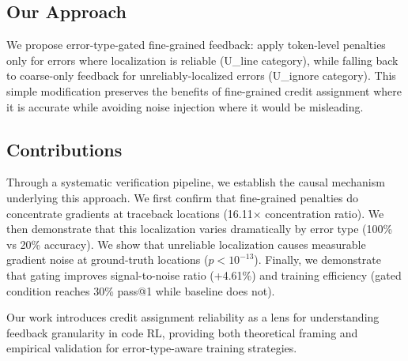 \subsection{Our Approach}

We propose error-type-gated fine-grained feedback: apply token-level penalties only for errors where localization is reliable (U\_line category), while falling back to coarse-only feedback for unreliably-localized errors (U\_ignore category). This simple modification preserves the benefits of fine-grained credit assignment where it is accurate while avoiding noise injection where it would be misleading.

\subsection{Contributions}

Through a systematic verification pipeline, we establish the causal mechanism underlying this approach. We first confirm that fine-grained penalties do concentrate gradients at traceback locations (16.11$\times$ concentration ratio). We then demonstrate that this localization varies dramatically by error type (100\% vs 20\% accuracy). We show that unreliable localization causes measurable gradient noise at ground-truth locations ($p<10^{-13}$). Finally, we demonstrate that gating improves signal-to-noise ratio (+4.61\%) and training efficiency (gated condition reaches 30\% pass@1 while baseline does not).

Our work introduces credit assignment reliability as a lens for understanding feedback granularity in code RL, providing both theoretical framing and empirical validation for error-type-aware training strategies.
